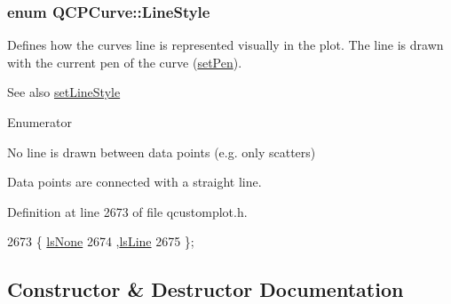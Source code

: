 \subsubsection[{Line\+Style}]{\setlength{\rightskip}{0pt plus 5cm}enum {\bf Q\+C\+P\+Curve\+::\+Line\+Style}}\label{class_q_c_p_curve_a2710e9f79302152cff794c6e16cc01f1}
Defines how the curve\textquotesingle{}s line is represented visually in the plot. The line is drawn with the current pen of the curve (\hyperlink{class_q_c_p_abstract_plottable_ab74b09ae4c0e7e13142fe4b5bf46cac7}{set\+Pen}). \begin{DoxySeeAlso}{See also}
\hyperlink{class_q_c_p_curve_a4a377ec863ff81a1875c3094a6177c19}{set\+Line\+Style} 
\end{DoxySeeAlso}
\begin{Desc}
\item[Enumerator]\par
\begin{description}
\item[{\em 
\hypertarget{class_q_c_p_curve_a2710e9f79302152cff794c6e16cc01f1aec1601a191cdf0b4e761c4c66092cc48}{}ls\+None\label{class_q_c_p_curve_a2710e9f79302152cff794c6e16cc01f1aec1601a191cdf0b4e761c4c66092cc48}
}]No line is drawn between data points (e.\+g. only scatters) \item[{\em 
\hypertarget{class_q_c_p_curve_a2710e9f79302152cff794c6e16cc01f1ade5822ce6fbf131d3df131795c2e1003}{}ls\+Line\label{class_q_c_p_curve_a2710e9f79302152cff794c6e16cc01f1ade5822ce6fbf131d3df131795c2e1003}
}]Data points are connected with a straight line. \end{description}
\end{Desc}


Definition at line 2673 of file qcustomplot.\+h.


\begin{DoxyCode}
2673                  \{ \hyperlink{class_q_c_p_curve_a2710e9f79302152cff794c6e16cc01f1aec1601a191cdf0b4e761c4c66092cc48}{lsNone}  
2674                    ,\hyperlink{class_q_c_p_curve_a2710e9f79302152cff794c6e16cc01f1ade5822ce6fbf131d3df131795c2e1003}{lsLine} 
2675                  \};
\end{DoxyCode}


\subsection{Constructor \& Destructor Documentation}
\hypertarget{class_q_c_p_curve_a36de58e2652b3fa47bdf9187d421d3ce}{}
